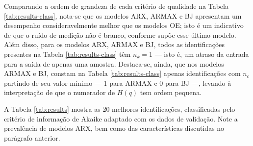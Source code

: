 \documentclass{ppgeesa}
\begin{document}
Comparando a ordem de grandeza de cada critério de qualidade na Tabela \ref{tab:results-class}, nota-se que os modelos ARX, ARMAX e BJ apresentam um desempenho consideravelmente melhor que os modelos OE;
isto é um indicativo de que o ruído de medição não é branco, conforme supõe esse último modelo.
Além disso, para os modelos ARX, ARMAX e BJ, todos as identificações presentes na Tabela \ref{tab:results-class} têm $n_k = 1$ --- isto é, um atraso da entrada para a saída de apenas uma amostra.
Destaca-se, ainda, que nos modelos ARMAX e BJ, constam na Tabela \ref{tab:results-class} apenas identificações com $n_c$ partindo de seu valor mínimo --- 1 para ARMAX e 0 para BJ ---, levando à interpretação de que o numerador de $H(q)$ tem ordem pequena.

A Tabela \ref{tab:results} mostra as 20 melhores identificações, classificadas pelo critério de informação de Akaike adaptado com os dados de validação.
Note a prevalência de modelos ARX, bem como das características discutidas no parágrafo anterior.
\end{document}
